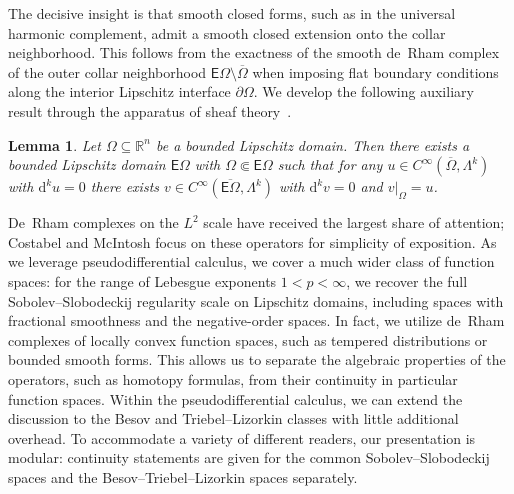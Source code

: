 \documentclass[10pt,a4paper]{amsart}
\newtheorem{lemma}[theorem]{Lemma}
\theoremstyle{definition}
\theoremstyle{remark}
\numberwithin{equation}{section}
\newcommand{\bbR}{{\mathbb R}}
\newcommand{\sfE}{{\mathsf E}}
\newcommand{\closure}{\overline}
\renewcommand{\restriction}{|}
\newcommand{\cartan}{{\mathrm d}}
\newcommand{\Domain}{{\Omega}}
\newcommand{\extDomain}{{\sfE\Omega}}
\newcommand{\Alt}[1]{\Lambda^{#1}}
\begin{document}
The decisive insight is that smooth closed forms, such as in the universal harmonic complement, admit a smooth closed extension onto the collar neighborhood. This follows from the exactness of the smooth de~Rham complex of the outer collar neighborhood $\extDomain \setminus \closure\Domain$ when imposing flat boundary conditions along the interior Lipschitz interface $\partial\Domain$. We develop the following auxiliary result through the apparatus of sheaf theory~\cite{cap1998garben,theeigenbook,mitrea2008poisson,goldshtein2011hodge,deitmar2025kohomologie}.


\begin{lemma}\label{introduction:lemma:smooth-extension}
    Let $\Domain \subseteq \bbR^{n}$ be a bounded Lipschitz domain. 
    Then there exists a bounded Lipschitz domain $\extDomain$ with $\Domain \Subset \extDomain$ 
    such that for any $u \in C^{\infty}(\closure{\Domain},\Alt{k})$ with $\cartan^{k} u = 0$
    there exists $v \in C^{\infty}(\closure{\extDomain},\Alt{k})$ with $\cartan^{k} v = 0$
    and $v \restriction_{\Domain} = u$. 
\end{lemma}




De~Rham complexes on the $L^{2}$ scale have received the largest share of attention; Costabel and McIntosh focus on these operators for simplicity of exposition.
As we leverage pseudodifferential calculus, we cover a much wider class of function spaces: for the range of Lebesgue exponents $1 < p < \infty$, we recover the full Sobolev--Slobodeckij regularity scale on Lipschitz domains, including spaces with fractional smoothness and the negative-order spaces.
In fact, we utilize de~Rham complexes of locally convex function spaces, such as tempered distributions or bounded smooth forms.
This allows us to separate the algebraic properties of the operators, such as homotopy formulas, from their continuity in particular function spaces. 
Within the pseudodifferential calculus, we can extend the discussion to the Besov and Triebel--Lizorkin classes with little additional overhead. 
To accommodate a variety of different readers, our presentation is modular: 
continuity statements are given for the common Sobolev--Slobodeckij spaces and the Besov--Triebel--Lizorkin spaces separately. 
\end{document}
